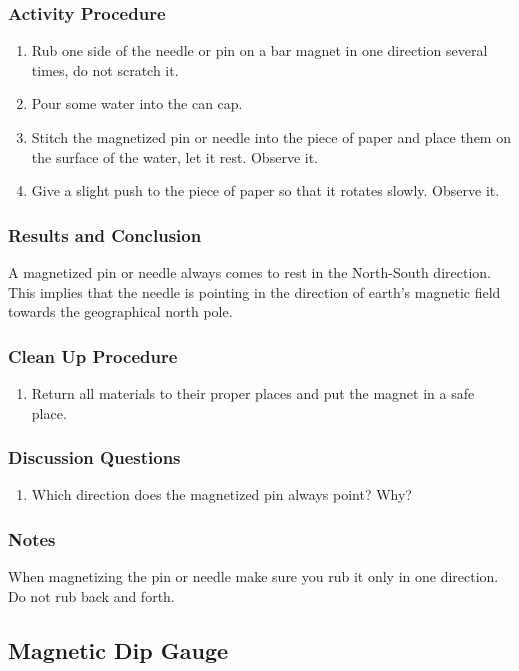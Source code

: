 \subsubsection*{Activity Procedure}
\begin{enumerate}
\item{Rub one side of the needle or pin on a bar magnet in one direction several times, do not scratch it.} 
\item{Pour some water into the can cap.} 
\item{Stitch the magnetized pin or needle into the piece of paper and place them on the surface of the water, let it rest. Observe it.} 
\item{Give a slight push to the piece of paper so that it rotates slowly. Observe it.} 
\end{enumerate}

\subsubsection*{Results and Conclusion}
A magnetized pin or needle always comes to rest in the North-South direction.  This implies that the needle is pointing in the direction of earth's magnetic field towards the geographical north pole.

\subsubsection*{Clean Up Procedure}
\begin{enumerate}
\item{Return all materials to their proper places and put the magnet in a safe place.} 
\end{enumerate}

\subsubsection*{Discussion Questions}
\begin{enumerate}
\item{Which direction does the magnetized pin always point? Why?}
\end{enumerate}

\subsubsection*{Notes}
When magnetizing the pin or needle make sure you rub it only in one direction. Do not rub back and forth.

\subsection{Magnetic Dip Gauge}

